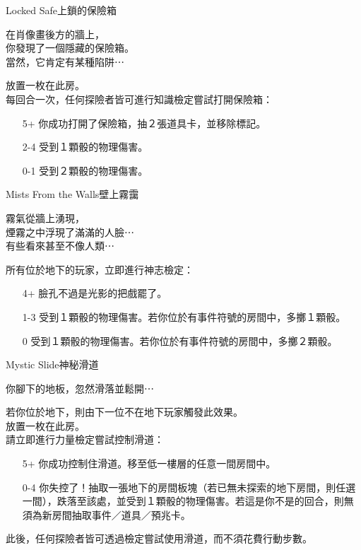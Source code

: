 %
\begin{EventCard}{Locked Safe}{上鎖的保險箱}

  \begin{CardStory}
    在肖像畫後方的牆上，\\
    你發現了一個隱藏的保險箱。\\
    當然，它肯定有某種陷阱⋯
  \end{CardStory}

  放置一枚在此房。\\[0.5em]
  每回合一次，任何探險者皆可進行知識檢定嘗試打開保險箱：
  \begin{itemize}
    \item[5+] 你成功打開了保險箱，抽２張道具卡，並移除標記。
    \item[2-4] 受到１顆骰的物理傷害。
    \item[0-1] 受到２顆骰的物理傷害。
  \end{itemize}

\end{EventCard}%
%
\begin{EventCard}{Mists From the Walls}{壁上霧靄}

  \begin{CardStory}
    霧氣從牆上湧現，\\
    煙霧之中浮現了滿滿的人臉⋯\\
    有些看來甚至不像人類⋯
  \end{CardStory}

  所有位於地下的玩家，立即進行神志檢定：
  \begin{itemize}
    \item[4+] 臉孔不過是光影的把戲罷了。
    \item[1-3] 受到１顆骰的物理傷害。若你位於有事件符號的房間中，多擲１顆骰。
    \item[0] 受到１顆骰的物理傷害。若你位於有事件符號的房間中，多擲２顆骰。
  \end{itemize}

\end{EventCard}%
%
\begin{EventCard}{Mystic Slide}{神秘滑道}

  \begin{CardStory}
    你腳下的地板，忽然滑落並鬆開⋯
  \end{CardStory}

  若你位於地下，則由下一位不在地下玩家觸發此效果。\\[0.5em]
  放置一枚在此房。\\[0.5em]
  請立即進行力量檢定嘗試控制滑道：
  \begin{itemize}
    \item[5+] 你成功控制住滑道。移至低一樓層的任意一間房間中。
    \item[0-4] 你失控了！抽取一張地下的房間板塊（若已無未探索的地下房間，則任選一間），跌落至該處，並受到１顆骰的物理傷害。若這是你不是的回合，則無須為新房間抽取事件／道具／預兆卡。
  \end{itemize}
  此後，任何探險者皆可透過檢定嘗試使用滑道，而不須花費行動步數。\\[0.5em]

\end{EventCard}%
